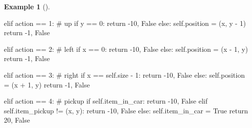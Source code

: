 \documentclass[
  letterpaper,
]{krantz}
\makeatletter
\newenvironment{Shaded}{\begin{snugshade}}{\end{snugshade}}
\newcommand{\CommentTok}[1]{\textcolor[rgb]{0.37,0.37,0.37}{#1}}
\newcommand{\ControlFlowTok}[1]{\textcolor[rgb]{0.00,0.23,0.31}{#1}}
\newcommand{\DecValTok}[1]{\textcolor[rgb]{0.68,0.00,0.00}{#1}}
\newcommand{\NormalTok}[1]{\textcolor[rgb]{0.00,0.23,0.31}{#1}}
\newcommand{\OperatorTok}[1]{\textcolor[rgb]{0.37,0.37,0.37}{#1}}
\newcommand{\VariableTok}[1]{\textcolor[rgb]{0.07,0.07,0.07}{#1}}
\newenvironment{kframe}{%
\medskip{}
\setlength{\fboxsep}{.8em}
 \def\at@end@of@kframe{}%
 \ifinner\ifhmode%
  \def\at@end@of@kframe{\end{minipage}}%
  \begin{minipage}{\columnwidth}%
 \fi\fi%
 \def\FrameCommand##1{\hskip\@totalleftmargin \hskip-\fboxsep
 \colorbox{shadecolor}{##1}\hskip-\fboxsep
     \hskip-\linewidth \hskip-\@totalleftmargin \hskip\columnwidth}%
 \MakeFramed {\advance\hsize-\width
   \@totalleftmargin\z@ \linewidth\hsize
   \@setminipage}}%
 {\par\unskip\endMakeFramed%
 \at@end@of@kframe}
\renewenvironment{Shaded}{\begin{kframe}}{\end{kframe}}
\theoremstyle{plain}
\theoremstyle{definition}
\newtheorem{example}{Example}[chapter]
\theoremstyle{definition}
\theoremstyle{remark}
\makeatother
\begin{document}
\begin{example}[]
\begin{tcolorbox}[enhanced jigsaw, bottomrule=.15mm, opacityback=0, breakable, colframe=quarto-callout-tip-color-frame, left=2mm, rightrule=.15mm, toprule=.15mm, leftrule=.75mm, arc=.35mm, colback=white]
\begin{codelisting}[H]
\begin{Shaded}
\begin{Highlighting}[]
        \ControlFlowTok{elif}\NormalTok{ action }\OperatorTok{==} \DecValTok{1}\NormalTok{:  }\CommentTok{\# up}
            \ControlFlowTok{if}\NormalTok{ y }\OperatorTok{==} \DecValTok{0}\NormalTok{:}
                \ControlFlowTok{return} \OperatorTok{{-}}\DecValTok{10}\NormalTok{, }\VariableTok{False}
            \ControlFlowTok{else}\NormalTok{:}
                \VariableTok{self}\NormalTok{.position }\OperatorTok{=}\NormalTok{ (x, y }\OperatorTok{{-}} \DecValTok{1}\NormalTok{)}
                \ControlFlowTok{return} \OperatorTok{{-}}\DecValTok{1}\NormalTok{, }\VariableTok{False}
        
        \ControlFlowTok{elif}\NormalTok{ action }\OperatorTok{==} \DecValTok{2}\NormalTok{:  }\CommentTok{\# left}
            \ControlFlowTok{if}\NormalTok{ x }\OperatorTok{==} \DecValTok{0}\NormalTok{:}
                \ControlFlowTok{return} \OperatorTok{{-}}\DecValTok{10}\NormalTok{, }\VariableTok{False}
            \ControlFlowTok{else}\NormalTok{:}
                \VariableTok{self}\NormalTok{.position }\OperatorTok{=}\NormalTok{ (x }\OperatorTok{{-}} \DecValTok{1}\NormalTok{, y)}
                \ControlFlowTok{return} \OperatorTok{{-}}\DecValTok{1}\NormalTok{, }\VariableTok{False}
        
        \ControlFlowTok{elif}\NormalTok{ action }\OperatorTok{==} \DecValTok{3}\NormalTok{:  }\CommentTok{\# right}
            \ControlFlowTok{if}\NormalTok{ x }\OperatorTok{==} \VariableTok{self}\NormalTok{.size }\OperatorTok{{-}} \DecValTok{1}\NormalTok{:}
                \ControlFlowTok{return} \OperatorTok{{-}}\DecValTok{10}\NormalTok{, }\VariableTok{False}
            \ControlFlowTok{else}\NormalTok{:}
                \VariableTok{self}\NormalTok{.position }\OperatorTok{=}\NormalTok{ (x }\OperatorTok{+} \DecValTok{1}\NormalTok{, y)}
                \ControlFlowTok{return} \OperatorTok{{-}}\DecValTok{1}\NormalTok{, }\VariableTok{False}
        
        \ControlFlowTok{elif}\NormalTok{ action }\OperatorTok{==} \DecValTok{4}\NormalTok{:  }\CommentTok{\# pickup}
            \ControlFlowTok{if} \VariableTok{self}\NormalTok{.item\_in\_car:}
                \ControlFlowTok{return} \OperatorTok{{-}}\DecValTok{10}\NormalTok{, }\VariableTok{False}
            \ControlFlowTok{elif} \VariableTok{self}\NormalTok{.item\_pickup }\OperatorTok{!=}\NormalTok{ (x, y):}
                \ControlFlowTok{return} \OperatorTok{{-}}\DecValTok{10}\NormalTok{, }\VariableTok{False}
            \ControlFlowTok{else}\NormalTok{:}
                \VariableTok{self}\NormalTok{.item\_in\_car }\OperatorTok{=} \VariableTok{True}
                \ControlFlowTok{return} \DecValTok{20}\NormalTok{, }\VariableTok{False}
        

\end{Highlighting}
\end{Shaded}
\end{codelisting}
\end{tcolorbox}
\end{example}
\end{document}

